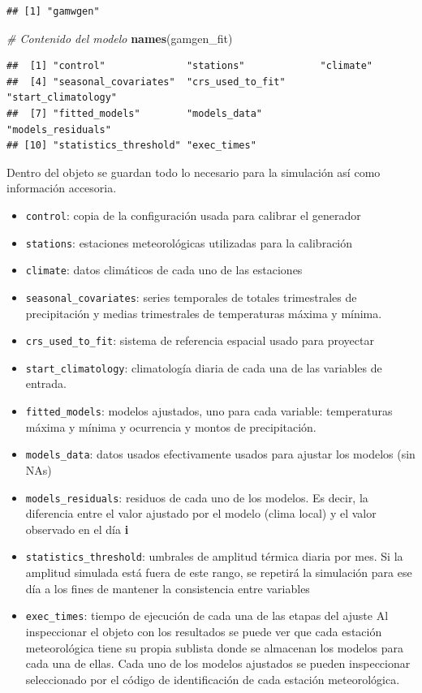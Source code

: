 \documentclass[
  12pt]{article}
\newenvironment{Shaded}{}{}
\newcommand{\CommentTok}[1]{\textcolor[rgb]{0.38,0.63,0.69}{\textit{#1}}}
\newcommand{\KeywordTok}[1]{\textcolor[rgb]{0.00,0.44,0.13}{\textbf{#1}}}
\newcommand{\NormalTok}[1]{#1}
\providecommand{\tightlist}{%
  \setlength{\itemsep}{0pt}\setlength{\parskip}{0pt}}
\begin{document}
\begin{verbatim}
## [1] "gamwgen"
\end{verbatim}

\begin{Shaded}
\begin{Highlighting}[]
\CommentTok{# Contenido del modelo }
\KeywordTok{names}\NormalTok{(gamgen_fit)}
\end{Highlighting}
\end{Shaded}

\begin{verbatim}
##  [1] "control"              "stations"             "climate"             
##  [4] "seasonal_covariates"  "crs_used_to_fit"      "start_climatology"   
##  [7] "fitted_models"        "models_data"          "models_residuals"    
## [10] "statistics_threshold" "exec_times"
\end{verbatim}

Dentro del objeto se guardan todo lo necesario para la simulación así como información accesoria.

\begin{itemize}
\tightlist
\item
  \texttt{control}: copia de la configuración usada para calibrar el generador
\item
  \texttt{stations}: estaciones meteorológicas utilizadas para la calibración
\item
  \texttt{climate}: datos climáticos de cada uno de las estaciones
\item
  \texttt{seasonal\_covariates}: series temporales de totales trimestrales de precipitación y medias trimestrales de temperaturas máxima y mínima.
\item
  \texttt{crs\_used\_to\_fit}: sistema de referencia espacial usado para proyectar
\item
  \texttt{start\_climatology}: climatología diaria de cada una de las variables de entrada.
\item
  \texttt{fitted\_models}: modelos ajustados, uno para cada variable: temperaturas máxima y mínima y ocurrencia y montos de precipitación.
\item
  \texttt{models\_data}: datos usados efectivamente usados para ajustar los modelos (sin NAs)
\item
  \texttt{models\_residuals}: residuos de cada uno de los modelos. Es decir, la diferencia entre el valor ajustado por el modelo (clima local) y el valor observado en el día \textbf{i}
\item
  \texttt{statistics\_threshold}: umbrales de amplitud térmica diaria por mes. Si la amplitud simulada está fuera de este rango, se repetirá la simulación para ese día a los fines de mantener la consistencia entre variables
\item
  \texttt{exec\_times}: tiempo de ejecución de cada una de las etapas del ajuste
  Al inspeccionar el objeto con los resultados se puede ver que cada estación meteorológica tiene su propia sublista donde se almacenan los modelos para cada una de ellas. Cada uno de los modelos ajustados se pueden inspeccionar seleccionado por el código de identificación de cada estación meteorológica.
\end{itemize}
\end{document}
